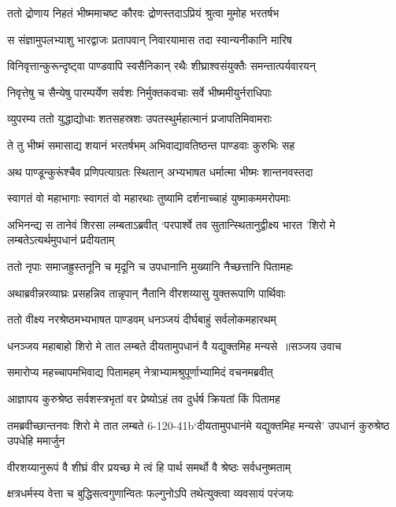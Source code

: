 \twolineshloka
{ततो द्रोणाय निहतं भीष्ममाचष्ट कौरवः}
{द्रोणस्तदाऽप्रियं श्रुत्वा मुमोह भरतर्षभ}


\twolineshloka
{स संज्ञामुपलभ्याशु भारद्वाजः प्रतापवान्}
{निवारयामास तदा स्वान्यनीकानि मारिष}


\twolineshloka
{विनिवृत्तान्कुरून्दृष्ट्वा पाण्डवापि स्वसैनिकान्}
{रथैः शीघ्राश्वसंयुक्तैः समन्तात्पर्यवारयन्}


\twolineshloka
{निवृत्तेषु च सैन्येषु पारम्पर्येण सर्वशः}
{निर्मुक्तकवचाः सर्वे भीष्ममीयुर्नराधिपाः}


\twolineshloka
{व्युपरम्य ततो युद्धाद्योधाः शतसहस्रशः}
{उपतस्थुर्महात्मानं प्रजापतिमिवामराः}


\twolineshloka
{ते तु भीष्मं समासाद्य शयानं भरतर्षभम्}
{अभिवाद्यावतिष्ठन्त पाण्डवाः कुरुभिः सह}


\twolineshloka
{अथ पाण्डून्कुरूंश्चैव प्रणिपत्याग्रतः स्थितान्}
{अभ्यभाषत धर्मात्मा भीष्मः शान्तनवस्तदा}


\twolineshloka
{स्वागतं वो महाभागाः स्वागतं वो महारथाः}
{तुष्यामि दर्शनाच्चाहं युष्माकममरोपमाः}


\threelineshloka
{अभिनन्द्य स तानेवं शिरसा लम्बताऽब्रवीत्}
{`परपार्श्वे तव सुतान्स्थितानुद्वीक्ष्य भारत}
{'शिरो मे लम्बतेऽत्यर्थमुपधानं प्रदीयताम्}


\twolineshloka
{ततो नृपाः समाजह्रुस्तनूनि च मृदूनि च}
{उपधानानि मुख्यानि नैच्छत्तानि पितामहः}


\twolineshloka
{अथाब्रवीन्नरव्याघ्रः प्रसहन्निव तान्नृपान्}
{नैतानि वीरशय्यासु युक्तरूपाणि पार्थिवाः}


\twolineshloka
{ततो वीक्ष्य नरश्रेष्ठमभ्यभाषत पाण्डवम्}
{धनञ्जयं दीर्घबाहुं सर्वलोकमहारथम्}


\threelineshloka
{धनञ्जय महाबाहो शिरो मे तात लम्बते}
{दीयतामुपधानं वै यद्युक्तमिह मन्यसे ॥सञ्जय उवाच}
{}


\twolineshloka
{समारोप्य महच्चापमभिवाद्य पितामहम्}
{नेत्राभ्यामश्रुपूर्णाभ्यामिदं वचनमब्रवीत्}


\twolineshloka
{आज्ञापय कुरुश्रेष्ठ सर्वशस्त्रभृतां वर}
{प्रेष्योऽहं तव दुर्धर्ष क्रियतां किं पितामह}


\twolineshloka
{तमब्रवीच्छान्तनवः शिरो मे तात लम्बते}
{6-120-41b`दीयतामुपधानंमे यद्युक्तमिह मन्यसे' उपधानं कुरुश्रेष्ठ उपधेहि ममार्जुन}


\twolineshloka
{वीरशय्यानुरूपं वै शीघ्रं वीर प्रयच्छ मे}
{त्वं हि पार्थ समर्थो वै श्रेष्ठः सर्वधनुष्मताम्}


\twolineshloka
{क्षत्रधर्मस्य वेत्ता च बुद्धिसत्वगुणान्वितः}
{फल्गुनोऽपि तथेत्युक्त्वा व्यवसायं परंजयः}


